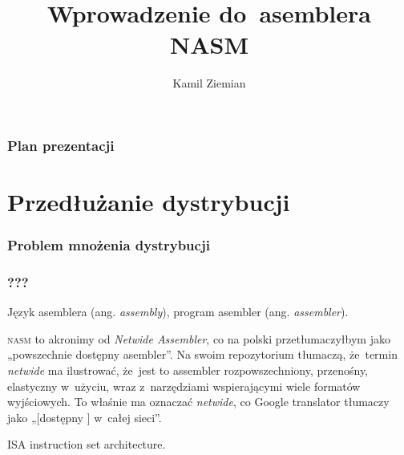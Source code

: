 \documentclass[10pt,t]{beamer}
\title{Wprowadzenie do~asemblera NASM}
\author{Kamil Ziemian \\
  \email}
\begin{document}





\RaggedRight





\maketitle





\begin{frame}
  \frametitle{Plan prezentacji}


  \tableofcontents

\end{frame}










\section{Przedłużanie dystrybucji}



\begin{frame}
  \frametitle{Problem mnożenia dystrybucji}




\end{frame}





\begin{frame}
  \frametitle{???}


  Język asemblera (ang. \textit{assembly}), program asembler (ang.
  \textit{assembler}).

  \textsc{nasm} to akronimy od \textit{Netwide Assembler}, co na polski
  przetłumaczyłbym jako „powszechnie dostępny asembler”. Na swoim
  repozytorium
   tłumaczą,
  że~termin \textit{netwide} ma ilustrować, że~jest to assembler
  rozpowszechniony, przenośny, elastyczny w~użyciu, wraz z~narzędziami
  wspierającymi wiele formatów wyjściowych. To właśnie ma oznaczać
  \textit{netwide}, co Google translator tłumaczy jako „[dostępny ] w~całej
  sieci”.

  ISA instruction set architecture.

\end{frame}
\end{document}
